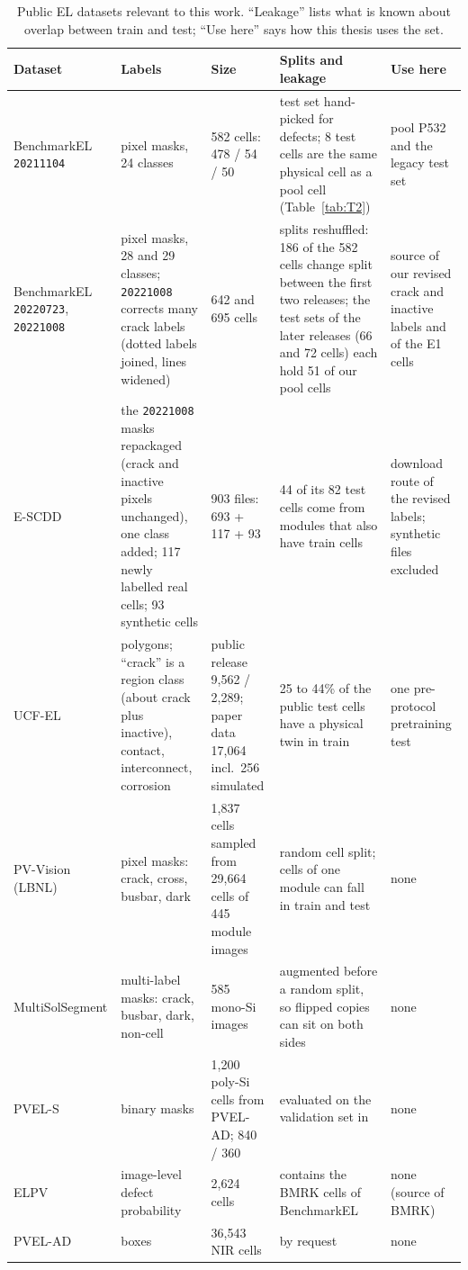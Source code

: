 \begin{table}[htbp]
\centering
\scriptsize
\caption{Public EL datasets relevant to this work. ``Leakage'' lists what is known about overlap between train and test;
``Use here'' says how this thesis uses the set.}
\label{tab:rw_datasets}
\begin{tabular}{>{\raggedright}p{2.4cm} >{\raggedright}p{2.9cm} >{\raggedright}p{2.6cm} >{\raggedright}p{3.6cm} >{\raggedright\arraybackslash}p{2.4cm}}
\toprule
Dataset & Labels & Size & Splits and leakage & Use here \\
\midrule
BenchmarkEL \texttt{20211104} \citep{pratt2023benchmark} & pixel masks, 24 classes & 582 cells: 478 / 54 / 50 &
test set hand-picked for defects; 8 test cells are the same physical cell as a pool cell (Table~\ref{tab:T2}) &
pool P532 and the legacy test set \\
BenchmarkEL \texttt{20220723}, \texttt{20221008} & pixel masks, 28 and 29 classes; \texttt{20221008} corrects many crack
labels (dotted labels joined, lines widened) & 642 and 695 cells &
splits reshuffled: 186 of the 582 cells change split between the first two releases; the test sets of the later releases
(66 and 72 cells) each hold 51 of our pool cells & source of our revised crack and inactive labels and of the E1 cells \\
E-SCDD \citep{hanifi2025escdd} & the \texttt{20221008} masks repackaged (crack and inactive pixels unchanged), one class
added; 117 newly labelled real cells; 93 synthetic cells & 903 files: 693 + 117 + 93 & 44 of its 82 test cells come from
modules that also have train cells & download route of the revised labels; synthetic files excluded \\
UCF-EL \citep{fioresi2022ucfel} & polygons; ``crack'' is a region class (about crack plus inactive), contact, interconnect,
corrosion & public release 9,562 / 2,289; paper data 17,064 incl.\ 256 simulated & 25 to 44\% of the public test cells have
a physical twin in train & one pre-protocol pretraining test \\
PV-Vision (LBNL) \citep{chen2023pvvision} & pixel masks: crack, cross, busbar, dark & 1,837 cells sampled from 29,664 cells
of 445 module images & random cell split; cells of one module can fall in train and test & none \\
MultiSolSegment \citep{sanghi2026multisolsegment} & multi-label masks: crack, busbar, dark, non-cell & 585 mono-Si images &
augmented before a random split, so flipped copies can sit on both sides & none \\
PVEL-S \citep{duan2025caak} & binary masks & 1,200 poly-Si cells from PVEL-AD; 840 / 360 & evaluated on the validation set
in \citet{duan2025caak} & none \\
ELPV \citep{deitsch2019elpv} & image-level defect probability & 2,624 cells & contains the BMRK cells of BenchmarkEL & none
(source of BMRK) \\
PVEL-AD \citep{su2023pvelad} & boxes & 36,543 NIR cells & by request & none \\
\bottomrule
\end{tabular}
\end{table}

